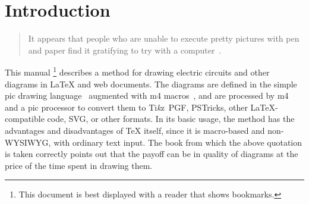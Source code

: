 \newcommand{\bq}{}
\newcommand{\dpic}{{\bq dpic}\xspace}
\newcommand{\Dpic}{{\bq Dpic}\xspace}
\newcommand{\dvips}{{\bq dvips}\xspace}
\newcommand{\gpic}{{\bq gpic}\xspace}
\newcommand{\Gpic}{{\bq Gpic}\xspace}
\newcommand{\groff}{{\bq groff}\xspace}
\newcommand{\latex}{\LaTeX\xspace}
\newcommand{\linespec}{{\sl linespec}\xspace}
\newcommand{\MetaPost}{{\bq MetaPost}\xspace}
\newcommand{\Mfour}{{\bq m4}\xspace}
\newcommand{\mfpic}{{\bq mfpic}\xspace}
\newcommand{\PDF}{{\bq PDF}\xspace}
\newcommand{\pic}{{\bq pic}\xspace}
\newcommand{\Pic}{{\bq Pic}\xspace}
\newcommand{\Postscript}{{\bq Postscript}\xspace}
\newcommand{\PSTricks}{{\bq PSTricks}\xspace}
\newcommand{\SVG}{{\bq SVG}\xspace}
\newcommand{\tex}{\TeX\xspace}
\newcommand{\Textregistered}{\textregistered\xspace}
\newcommand{\TPGF}{{\bq Ti{\it k}z~PGF}\xspace}
\newcommand{\Tikz}{{\bq Ti{\it k}z}\xspace}
\newcommand{\tpic}{{\bq tpic}\xspace}
\newcommand{\xfig}{{\bq xfig}\xspace}
\newcommand{\Xfig}{{\bq Xfig}\xspace}
%
\newcommand{\xection}[1]{\section[\texorpdfstring{#1\ \dotfill}{#1}]{#1}}
\newcommand{\NVL}{\\\hspace*{\parindent}}
\newcommand{\brtt}{\hfill\break\hspace*\parindent}
\newcommand{\lbr}{{\tt\char123}}
\newcommand{\rbr}{{\tt\char125}}
\newcommand{\bsl}{{\tt\char92}}
\newcommand{\SR}[1]{\hyperref[#1]{Section~\ref*{#1}}}
\newcommand{\PR}[1]{\hyperref[#1]{page~\pageref*{#1}}}
\newcommand{\FR}[1]{\hyperref[#1]{Figure~\ref*{#1}}}
\newcommand{\FRS}[1]{\hyperref[#1]{Figures~\ref*{#1}}}
\newcommand{\MR}[2]{\hyperref[#1]{#2}}
\newcommand{\REF}[1]{\hyperref[#1]{\ref*{#1}}}
\newcommand{\LQ}{\char96}
\newcommand{\RQ}{\char39}
%
\newcommand{\Example}[1]{\vspace{\parsep}\noindent {\bf Example #1:}}
%
%
\xection{Introduction\label{Introduction:}}
   \begin{quotation}\noindent
   It appears that people
   who are unable to execute pretty pictures with pen and paper find it
   gratifying to try with a computer~\cite{Landauer95}.
   \end{quotation}

This manual%
\footnote{This document is best displayed with a reader that shows bookmarks.}
describes a method for drawing electric circuits and
other diagrams in \latex and web documents.
The diagrams are defined in the simple \pic drawing language~\cite{KRpic}
augmented with \Mfour macros~\cite{KRm4}, and are
processed by \Mfour and a \pic processor to
convert them to \TPGF, \PSTricks, other \latex-compatible code, \SVG,
or other formats.
In its basic usage, the method has the advantages and disadvantages of
\tex itself, since it is macro-based and non-WYSIWYG,
with ordinary text input.  The book from which the above quotation
is taken correctly points out that the payoff can be in quality of
diagrams at the price of the time spent in drawing them.

